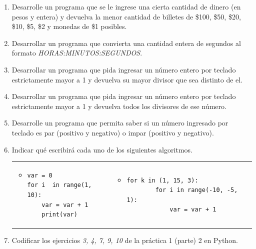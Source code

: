\documentclass[a4paper,10pt]{article}
\begin{document}
\begin{enumerate}
\item Desarrolle un programa que se le ingrese una cierta cantidad de dinero (en pesos y entera) y devuelva la menor cantidad de billetes de \$100, \$50, \$20, \$10, \$5, \$2 y monedas de \$1 posibles.
    
\item Desarrollar un programa que convierta una cantidad entera de segundos al formato \emph{HORAS:MINUTOS:SEGUNDOS}.

\item Desarrollar un programa que pida ingresar un n\'umero entero por teclado estrictamente mayor a 1 y devuelva su mayor divisor que sea distinto de el.
    
\item Desarrollar un programa que pida ingresar un n\'umero entero por teclado estrictamente mayor a 1 y devuelva todos los divisores de ese n\'umero.
    
\item Desarrolle un programa que permita saber si un n\'umero ingresado por teclado es par (positivo y negativo) o impar (positivo y negativo).

\item Indicar qu\'e escribir\'a cada uno de los siguientes algoritmos. 

\begin{tabular}{p{} p{} }
    \begin{itemize}
        \item[a-]
\begin{verbatim}
var = 0
for i  in range(1, 10):
    var = var + 1
    print(var)
\end{verbatim}
    \end{itemize}
&
    \begin{itemize}
        \item[b-]
\begin{verbatim}
for k in (1, 15, 3):
        for i in range(-10, -5, 1):
            var = var + 1
\end{verbatim}
    \end{itemize}
\\
\end{tabular}

\item Codificar los ejercicios \emph{3, 4, 7, 9, 10} de la pr\'actica 1 (parte) 2 en Python.

\end{enumerate}
\end{document}

